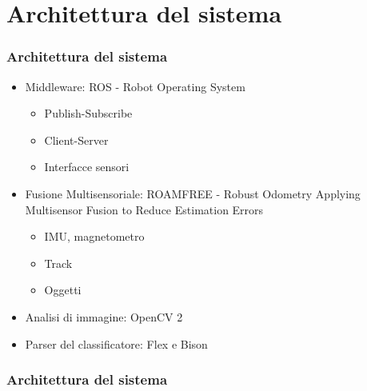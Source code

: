 \documentclass[c]{beamer}
\begin{document}

\section{Architettura del sistema}
\begin{frame}
\frametitle{Architettura del sistema}

\begin{itemize}
\item Middleware: ROS - Robot Operating System
\begin{itemize}
 \item Publish-Subscribe
 \item Client-Server
 \item Interfacce sensori
\end{itemize}

\item Fusione Multisensoriale: ROAMFREE - Robust Odometry Applying Multisensor Fusion to Reduce Estimation Errors
\begin{itemize}
 \item IMU, magnetometro
 \item Track
 \item Oggetti
\end{itemize}

\item Analisi di immagine: OpenCV 2

\item Parser del classificatore: Flex e Bison
\end{itemize}

\end{frame}


\begin{frame}
\frametitle{Architettura del sistema}


\end{frame}
\end{document}
